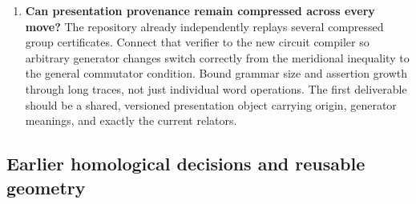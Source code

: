 \begin{enumerate}[label=\textbf{Q\arabic*.},leftmargin=3em,start=7]
\item \textbf{Can presentation provenance remain compressed across every move?}
The repository already independently replays several compressed group
certificates. Connect that verifier to the new circuit compiler so arbitrary
generator changes switch correctly from the meridional inequality to the
general commutator condition. Bound grammar size and assertion growth
through long traces, not just individual word operations. The first
deliverable should be a shared, versioned presentation object carrying
origin, generator meanings, and exactly the current relators.
\end{enumerate}

\subsection{Earlier homological decisions and reusable geometry}

